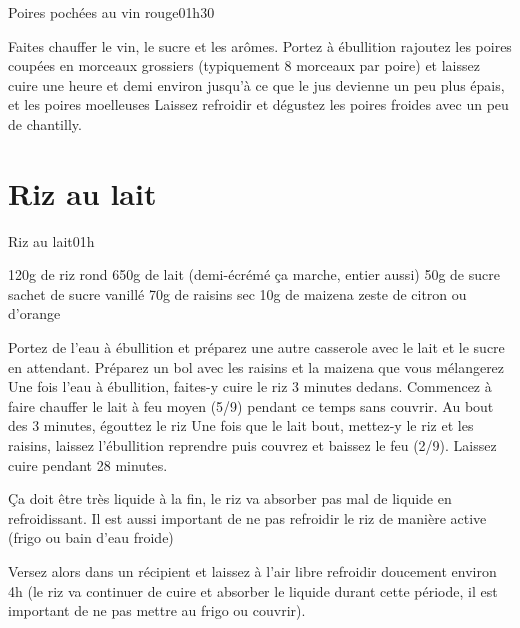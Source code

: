{\begin{recette}{Poires pochées au vin rouge}{0}{1h30}{}
\begin{preparation}
\etape Faites chauffer le vin, le sucre et les arômes. Portez à ébullition
\etape rajoutez les poires coupées en morceaux grossiers (typiquement 8 morceaux par poire) et laissez cuire une heure et demi 
environ jusqu'à ce que le jus devienne un peu plus épais, et les poires moelleuses
\etape Laissez refroidir et dégustez les poires froides avec un peu de chantilly.
\end{preparation}
\end{recette}

\section{Riz au lait}
\begin{recette}{Riz au lait}{0}{1h}{}
\begin{ingredients}[4 pers.]
\ingredient 120g de riz rond
\ingredient 650g de lait (demi-écrémé ça marche, entier aussi)%
\ingredient 50g de sucre
 sachet de sucre vanillé
\ingredient 70g de raisins sec
\ingredient 10g de maizena
\ingredient zeste de citron ou d'orange
\end{ingredients}

\begin{preparation}
\etape Portez de l'eau à ébullition et préparez une autre casserole avec le lait et le sucre en attendant.
\etape Préparez un bol avec les raisins et la maizena que vous mélangerez
\etape Une fois l'eau à ébullition, faites-y cuire le riz 3 minutes dedans. Commencez à faire chauffer le lait à feu moyen (5/9) pendant ce temps sans couvrir. 
\etape Au bout des 3 minutes, égouttez le riz
\etape Une fois que le lait bout, mettez-y le riz et les raisins, laissez l'ébullition reprendre puis couvrez et baissez le feu (2/9). Laissez cuire pendant 28 minutes. 
\begin{remarque}
Ça doit être très liquide à la fin, le riz va absorber pas mal de liquide en refroidissant. Il est aussi important de ne pas refroidir le riz de manière active (frigo ou bain d'eau froide)
\end{remarque}
\etape Versez alors dans un récipient et laissez à l'air libre refroidir doucement environ 4h (le riz va continuer de cuire et absorber le liquide durant cette période, il est important de ne pas mettre au frigo ou couvrir).
\end{preparation}
\end{recette}

}
